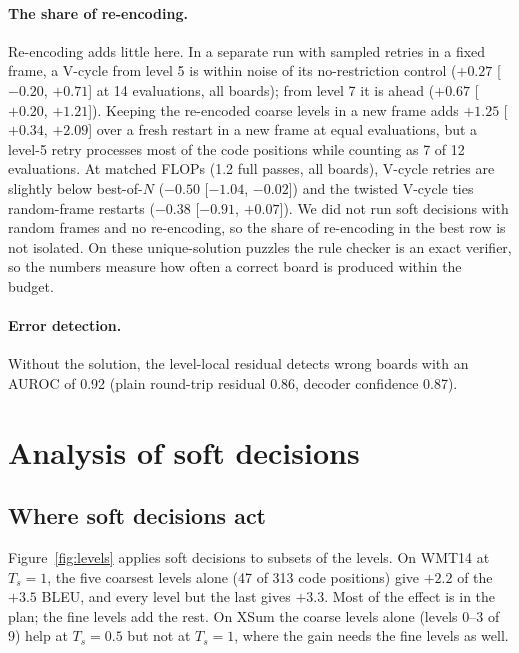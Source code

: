 \documentclass[11pt]{article}
\begin{document}
\paragraph{The share of re-encoding.} Re-encoding adds little here. In a separate run with sampled retries in a fixed frame, a V-cycle from
level 5 is within noise of its no-restriction control ($+0.27$ [$-0.20$, $+0.71$] at 14 evaluations, all boards); from
level 7 it is ahead ($+0.67$ [$+0.20$, $+1.21$]). Keeping the re-encoded coarse levels in a new frame adds $+1.25$
[$+0.34$, $+2.09$] over a fresh restart in a new frame at equal evaluations, but a level-5 retry processes most of the
code positions while counting as 7 of 12 evaluations. At matched FLOPs (1.2 full passes, all boards), V-cycle retries
are slightly below best-of-$N$ ($-0.50$ [$-1.04$, $-0.02$]) and the twisted V-cycle ties random-frame restarts
($-0.38$ [$-0.91$, $+0.07$]). We did not run soft decisions with random frames and no re-encoding, so the share of
re-encoding in the best row is not isolated. On these unique-solution puzzles the rule checker is an exact verifier,
so the numbers measure how often a correct board is produced within the budget.

\paragraph{Error detection.} Without the solution, the level-local residual detects wrong boards with
an AUROC of 0.92 (plain round-trip residual 0.86, decoder confidence 0.87).

\section{Analysis of soft decisions}
\label{sec:analysis}

\subsection{Where soft decisions act}

Figure~\ref{fig:levels} applies soft decisions to subsets of the levels. On WMT14 at $T_s=1$, the five coarsest levels
alone (47 of 313 code positions) give $+2.2$ of the $+3.5$ BLEU, and every level but the last gives $+3.3$. Most of the
effect is in the plan; the fine levels add the rest. On XSum the coarse levels alone (levels 0--3 of 9) help at $T_s=0.5$ but not at
$T_s=1$, where the gain needs the fine levels as well.
\end{document}
